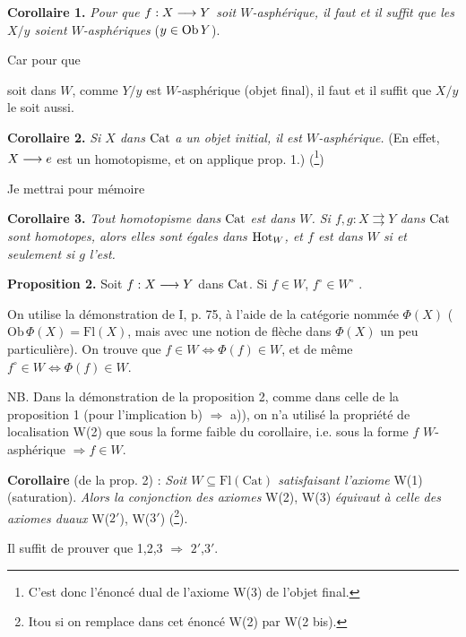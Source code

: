 \textbf{Corollaire 1.} \textit{Pour que $f : X \longrightarrow Y$ soit $W$-asphérique, il faut et il suffit que les $X/y$ soient $W$-asphériques} ($y \in \operatorname{Ob} Y$).

Car pour que
soit dans $W$, comme $Y/y$ est $W$-asphérique (objet final), il faut et il suffit que $X/y$ le soit aussi.

\textbf{Corollaire 2.} \textit{Si $X$ dans} $\mathrm{Cat}$ \textit{a un objet initial, il est $W$-asphérique.} (En effet, $X \longrightarrow e$ est un homotopisme, et on applique prop. 1.) (\footnote{C'est donc l'énoncé dual de l'axiome W(3) de l'objet final.})

Je mettrai pour mémoire

\textbf{Corollaire 3.} \textit{Tout homotopisme dans} $\mathrm{Cat}$ \textit{est dans $W$. Si $f, g : X \rightrightarrows Y$ dans} $\mathrm{Cat}$ \textit{sont homotopes, alors elles sont égales dans} $\mathrm{Hot}_W$\textit{, et $f$ est dans $W$ si et seulement si $g$ l'est.}

\textbf{Proposition 2.} Soit $f : X \longrightarrow Y$ dans $\mathrm{Cat}$. Si $f \in W$, $f^\circ \in W^\circ$ .

On utilise la démonstration de I, p. 75, à l'aide de la catégorie nommée $\Phi(X)$ ($\mathrm{Ob}\,\Phi(X) = \mathrm{Fl}(X)$, mais avec une notion de flèche dans $\Phi(X)$ un peu particulière). On trouve que $f \in W \iff \Phi(f) \in W$, et de même $f^\circ \in W \iff \Phi(f) \in W$.

NB. Dans la démonstration de la proposition 2, comme dans celle de la proposition 1 (pour l'implication b) $\Longrightarrow$ a)), on n'a utilisé la propriété de localisation W(2) que sous la forme faible du corollaire, i.e. sous la forme $f$ $W$-asphérique $\Longrightarrow f \in W$.

\textbf{Corollaire} (de la prop. 2) : \textit{Soit $W \subseteq \mathrm{Fl}(\mathrm{Cat})$ satisfaisant l'axiome} W(1) (saturation). \textit{Alors la conjonction des axiomes} W(2), W(3) \textit{équivaut à celle des axiomes duaux} W($2'$), W($3'$) (\footnote[5]{Itou si on remplace dans cet énoncé W(2) par W(2 bis).}).

Il suffit de prouver que 1,2,3 $\Longrightarrow$ $2'$,$3'$.


